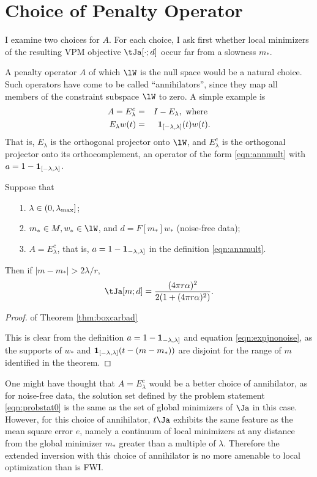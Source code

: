 \section{Choice of Penalty Operator}

I examine two choices for $A$. For each choice, I ask first whether local minimizers 
of the resulting VPM objective $\tJa[\cdot;d]$ occur far from a slowness $m_*$. 

A penalty operator $A$ of which $\lW$ is the null space would be a
natural choice. Such operators have come to be called
``annihilators'', since they map all members of the constraint
subspace $\lW$ to zero.  A simple example is
\begin{eqnarray}
  A = E^c_{\lambda}&=&I - E_{\lambda},\mbox{ where } \nonumber \\
  E_{\lambda}w(t) &=&{\bf 1}_{[-\lambda,\lambda]}(t)w(t). 
                      \label{eqn:ann0}
\end{eqnarray}
That is, $E_{\lambda}$ is the orthogonal projector onto $\lW$,
and $E_{\lambda}^c$ is the orthogonal projector onto its
orthocomplement, an operator of the form \ref{eqn:annmult} with $a
= 1 - {\bf 1}_{[-\lambda,\lambda]}$. %

\begin{theorem}
  \label{thm:boxcarbad}
  Suppose that
  \begin{itemize}
  \item[1. ] $\lambda \in (0,\lambda_{\rm max}]$;
  \item[2. ] $m_*\in M, w_*\in \lW$, and $d=F[m_*]w_*$ (noise-free
    data);
  \item[3. ] $A=E^c_{\lambda}$, that is, $a=1-{\bf 1}_{-\lambda,\lambda]}$ in
    the definition \ref{eqn:annmult}.
  \end{itemize}
  Then if $|m-m_*| >  2\lambda/r$,
  \[
    \tJa[m;d] = \frac{(4\pi r \alpha)^2}{2(1+(4 \pi r \alpha)^2)}.
  \]
\end{theorem}

\begin{proof} of Theorem \ref{thm:boxcarbad}
  
 This is clear from the definition $a = 1-{\bf 1}_{-\lambda,\lambda]}$ and equation \ref{eqn:expjnonoise}, as the supports of $w_*$ and ${\bf
    1}_{[-\lambda,\lambda]}(t-(m-m_*))$ are disjoint for the range of
  $m$ identified in the theorem.
\end{proof}

One might have thought that $A=E^c_{\lambda}$ would be a better choice
of annihilator, as for noise-free
data, the solution set defined by the problem statement
\ref{eqn:probstat0} is the same as the set of global minimizers of
$\Ja$ in this case. However, for this choice of annihilator,
$t\Ja$ exhibits the same feature as the mean square error $e$, namely
a continuum of local minimizers at any distance from the global
minimizer $m_*$ greater than a multiple of $\lambda$. Therefore the
extended inversion with this choice of annihilator is no more amenable
to local optimization than is FWI.

